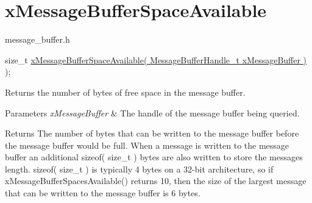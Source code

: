 \hypertarget{group__xMessageBufferSpaceAvailable}{}\section{x\+Message\+Buffer\+Space\+Available}
\label{group__xMessageBufferSpaceAvailable}
message\+\_\+buffer.\+h 
\begin{DoxyPre}
size\_t \hyperlink{message__buffer_8h_a9f1e75a283ef603e914e10ae354e5ab8}{xMessageBufferSpaceAvailable( MessageBufferHandle\_t xMessageBuffer )} );
\end{DoxyPre}
 Returns the number of bytes of free space in the message buffer.


\begin{DoxyParams}{Parameters}
{\em x\+Message\+Buffer} & The handle of the message buffer being queried.\\
\hline
\end{DoxyParams}
\begin{DoxyReturn}{Returns}
The number of bytes that can be written to the message buffer before the message buffer would be full. When a message is written to the message buffer an additional sizeof( size\+\_\+t ) bytes are also written to store the message\textquotesingle{}s length. sizeof( size\+\_\+t ) is typically 4 bytes on a 32-\/bit architecture, so if x\+Message\+Buffer\+Spaces\+Available() returns 10, then the size of the largest message that can be written to the message buffer is 6 bytes. 
\end{DoxyReturn}
